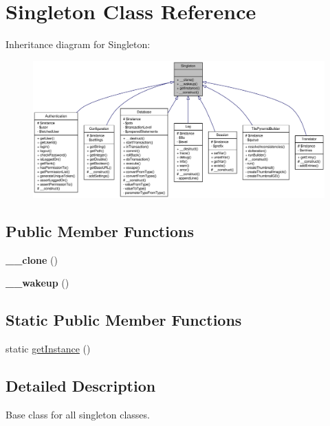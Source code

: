 \hypertarget{classSingleton}{
\section{Singleton Class Reference}
\label{classSingleton}
}


Inheritance diagram for Singleton:\nopagebreak
\begin{figure}[H]
\begin{center}
\leavevmode
\includegraphics[width=400pt]{classSingleton__inherit__graph}
\end{center}
\end{figure}
\subsection*{Public Member Functions}
\begin{DoxyCompactItemize}
\item 
\hypertarget{classSingleton_aaaeee573441ef99b2821912e745447e1}{
{\bfseries \_\-\_\-clone} ()}
\label{classSingleton_aaaeee573441ef99b2821912e745447e1}

\item 
\hypertarget{classSingleton_a0d34375ae499edde567b986d0d721d87}{
{\bfseries \_\-\_\-wakeup} ()}
\label{classSingleton_a0d34375ae499edde567b986d0d721d87}

\end{DoxyCompactItemize}
\subsection*{Static Public Member Functions}
\begin{DoxyCompactItemize}
\item 
static \hyperlink{classSingleton_a475e05eea7a862ab6e22d7599ead8dc1}{getInstance} ()
\end{DoxyCompactItemize}


\subsection{Detailed Description}
Base class for all singleton classes. 

